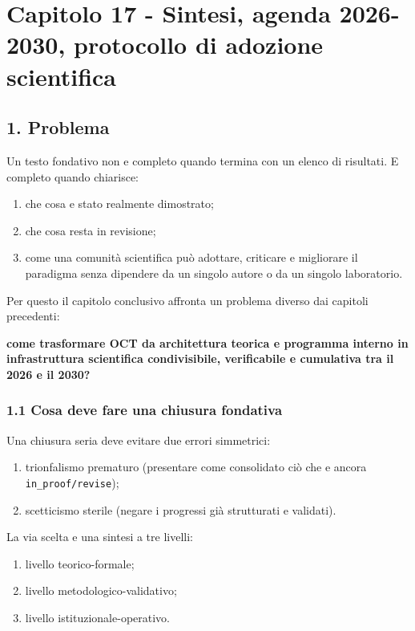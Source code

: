\chapter{Capitolo 17 - Sintesi, agenda 2026-2030, protocollo di adozione scientifica}

\section{1. Problema}

Un testo fondativo non e completo quando termina con un elenco di risultati. E completo quando chiarisce:

\begin{enumerate}
\def\labelenumi{\arabic{enumi}.}
\tightlist
\item
  che cosa e stato realmente dimostrato;
\item
  che cosa resta in revisione;
\item
  come una comunità scientifica può adottare, criticare e migliorare il paradigma senza dipendere da un singolo autore o da un singolo laboratorio.
\end{enumerate}

Per questo il capitolo conclusivo affronta un problema diverso dai capitoli precedenti:

\textbf{come trasformare OCT da architettura teorica e programma interno in infrastruttura scientifica condivisibile, verificabile e cumulativa tra il 2026 e il 2030?}

\subsection{1.1 Cosa deve fare una chiusura fondativa}

Una chiusura seria deve evitare due errori simmetrici:

\begin{enumerate}
\def\labelenumi{\arabic{enumi}.}
\tightlist
\item
  trionfalismo prematuro (presentare come consolidato ciò che e ancora \texttt{in\_proof/revise});
\item
  scetticismo sterile (negare i progressi già strutturati e validati).
\end{enumerate}

La via scelta e una sintesi a tre livelli:

\begin{enumerate}
\def\labelenumi{\arabic{enumi}.}
\tightlist
\item
  livello teorico-formale;
\item
  livello metodologico-validativo;
\item
  livello istituzionale-operativo.
\end{enumerate}

